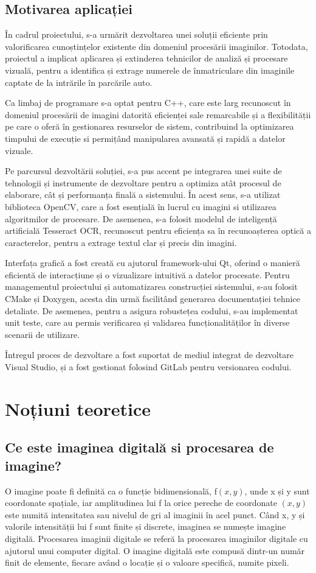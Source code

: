 \documentclass[a4paper,12pt]{report}
\begin{document}
\section{Motivarea aplicației}
În cadrul proiectului, s-a urmărit dezvoltarea unei soluții eficiente prin valorificarea cunoștințelor existente din domeniul procesării imaginilor. Totodata, proiectul a implicat aplicarea și extinderea tehnicilor de analiză și procesare vizuală, pentru a identifica și extrage numerele de înmatriculare din imaginile captate de la intrările în parcările auto.

Ca limbaj de programare s-a optat pentru C++, care este larg recunoscut în domeniul procesării de imagini datorită eficienței sale remarcabile și a flexibilității pe care o oferă în gestionarea resurselor de sistem, contribuind la optimizarea timpului de execuție si permițând manipularea avansată și rapidă a datelor vizuale.

Pe parcursul dezvoltării soluției, s-a pus accent pe integrarea unei suite de tehnologii și instrumente de dezvoltare pentru a optimiza atât procesul de elaborare, cât și performanța finală a sistemului. În acest sens, s-a utilizat biblioteca OpenCV, care a fost esențială în lucrul cu imagini si utilizarea algoritmilor de procesare. De asemenea, s-a folosit modelul de inteligență artificială Tesseract OCR, recunoscut pentru eficiența sa în recunoașterea optică a caracterelor, pentru a extrage textul clar și precis din imagini.

Interfața grafică a fost creată cu ajutorul framework-ului Qt, oferind o manieră eficientă de interacțiune și o vizualizare intuitivă a datelor procesate. Pentru managementul proiectului și automatizarea construcției sistemului, s-au folosit CMake și Doxygen, acesta din urmă facilitând generarea documentației tehnice detaliate. De asemenea, pentru a asigura robustețea codului, s-au implementat unit teste, care au permis verificarea și validarea funcționalităților în diverse scenarii de utilizare.

Întregul proces de dezvoltare a fost suportat de mediul integrat de dezvoltare Visual Studio, și a fost gestionat folosind GitLab pentru versionarea codului.

\chapter{Noțiuni teoretice}
\section{Ce este imaginea digitală si procesarea de imagine?}
O imagine poate fi definită ca o funcție bidimensională, f$(x,y)$, unde x și y sunt coordonate spațiale, iar amplitudinea lui f la orice pereche de coordonate $(x, y)$ este numită intensitatea sau nivelul de gri al imaginii în acel punct. Când x, y și valorile intensității lui f sunt finite și discrete, imaginea se numește imagine digitală. Procesarea imaginii digitale se referă la procesarea imaginilor digitale cu ajutorul unui computer digital. O imagine digitală este compusă dintr-un număr finit de elemente, fiecare având o locație și o valoare specifică, numite pixeli.
\end{document}
